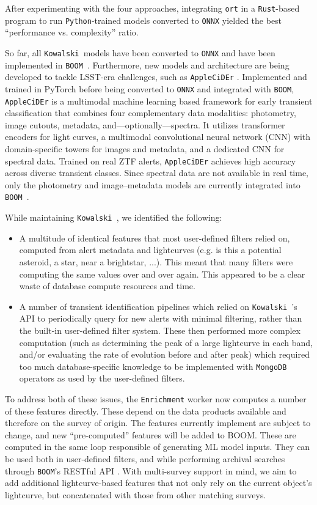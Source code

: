 \documentclass[twocolumn]{aastex631}
\newcommand{\boom}{\texttt{BOOM }}
\newcommand{\kowalski}{\texttt{Kowalski }}
\newcommand{\mongo}{\texttt{MongoDB }}
\begin{document}
After experimenting with the four approaches, integrating \texttt{ort} in a \texttt{Rust}-based program to run \texttt{Python}-trained models converted to \texttt{ONNX} yielded the best ``performance vs. complexity'' ratio.

So far, all \kowalski models have been converted to \texttt{ONNX} and have been implemented in \boom. Furthermore, new models and architecture are being developed to tackle LSST-era challenges, such as \texttt{AppleCiDEr} \cite{junell2025applyingmultimodallearningclassify,xu2025applecideriispectranet}. Implemented and trained in PyTorch before being converted to \texttt{ONNX} and integrated with \texttt{BOOM}, \texttt{AppleCiDEr} is a multimodal machine learning based framework for early transient classification that combines four complementary data modalities: photometry, image cutouts, metadata, and---optionally---spectra. It utilizes transformer encoders for light curves, a multimodal convolutional neural network (CNN) with domain-specific towers for images and metadata, and a dedicated CNN for spectral data. Trained on real ZTF alerts, \texttt{AppleCiDEr} achieves high accuracy across diverse transient classes. Since spectral data are not available in real time, only the photometry and image–metadata models are currently integrated into \boom.

While maintaining \kowalski, we identified the following:
\begin{itemize}
    \item A multitude of identical features that most user-defined filters relied on, computed from alert metadata and lightcurves (e.g. is this a potential asteroid, a star, near a brightstar, ...). This meant that many filters were computing the same values over and over again. This appeared to be a clear waste of database compute resources and time.
    \item A number of transient identification pipelines which relied on \kowalski's API to periodically query for new alerts with minimal filtering, rather than the built-in user-defined filter system. These then performed more complex computation (such as determining the peak of a large lightcurve in each band, and/or evaluating the rate of evolution before and after peak) which required too much database-specific knowledge to be implemented with \mongo operators as used by the user-defined filters.
\end{itemize}

To address both of these issues, the \texttt{Enrichment} worker now computes a number of these features directly. These depend on the data products available and therefore on the survey of origin. The features currently implement are subject to change, and new ``pre-computed'' features will be added to BOOM.
These are computed in the same loop responsible of generating ML model inputs. They can be used both in user-defined filters, and while performing archival searches through \texttt{BOOM}'s RESTful API \citep{rest}. With multi-survey support in mind, we aim to add additional lightcurve-based features that not only rely on the current object's lightcurve, but concatenated with those from other matching surveys.
\end{document}

